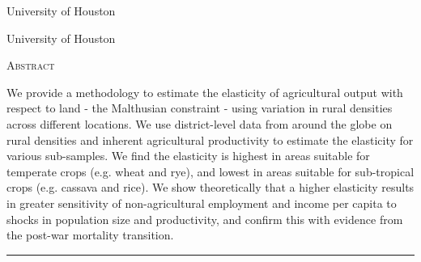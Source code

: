 \documentclass[11pt]{article}
\begin{document}
\begin{titlepage}
\vspace{2in} \noindent {\large \today}

\vspace{.5in} 

\vspace{.25in} 

\vspace{.05in} \noindent University of Houston

\vspace{.25in} 

\vspace{.05in} \noindent University of Houston

\vfill \noindent \textsc{Abstract} \hrulefill

\vspace{.05in} \noindent We provide a methodology to estimate the elasticity of agricultural output with respect to land - the Malthusian constraint - using variation in rural densities across different locations. We use district-level data from around the globe on rural densities and inherent agricultural productivity to estimate the elasticity for various sub-samples. We find the elasticity is highest in areas suitable for temperate crops (e.g. wheat and rye), and lowest in areas suitable for sub-tropical crops (e.g. cassava and rice). We show theoretically that a higher elasticity results in greater sensitivity of non-agricultural employment and income per capita to shocks in population size and productivity, and confirm this with evidence from the post-war mortality transition.

\vspace{.1in} \hrule

\vspace{.5in} 

\vspace{.1in} 

\vspace{.1in} 
\end{titlepage}
\end{document}

